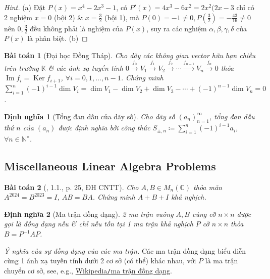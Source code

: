 \documentclass{article}
\newtheorem{baitoan}{Bài toán}
\newtheorem{dinhnghia}{Định nghĩa}
\begin{document}
\begin{proof}[Hint]
	(a) Đặt $P(x) = x^4 - 2x^3 - 1$, có $P'(x) = 4x^3 - 6x^2 = 2x^2(2x - 3$ chỉ có 2 nghiệm $x = 0$ (bội 2) \& $x = \frac{3}{2}$ (bội 1), mà $P(0) = -1\ne0,P(\frac{3}{2}) = -\frac{43}{16}\ne0$ nên $0,\frac{3}{2}$ đều không phải là nghiệm của $P(x)$, suy ra các nghiệm $\alpha,\beta,\gamma,\delta$ của $P(x)$ là phân biệt. (b) 
\end{proof}

\begin{baitoan}[Đại học Đồng Tháp]
	Cho dãy các không gian vector hữu hạn chiều trên trường $\mathbb{K}$ \& các ánh xạ tuyến tính $0\xrightarrow{f_0}V_1\xrightarrow{f_1}V_2\xrightarrow{f_2}\cdots\xrightarrow{f_{n-1}}V_n\xrightarrow{f_n}0$ thỏa $\operatorname{Im}f_i = \operatorname{Ker}f_{i+1}$, $\forall i = 0,1,\ldots,n-1$. Chứng minh $\sum_{i=1}^n (-1)^{i-1}\dim V_i = \dim V_1 - \dim V_2 + \dim V_3 - \cdots + (-1)^{n-1}\dim V_n = 0$.
\end{baitoan}

\begin{dinhnghia}[Tổng đan dấu của dãy số]
	Cho dãy số $(a_n)_{n=1}^\infty$, tổng đan dấu thứ $n$ của $(a_n)$ được định nghĩa bởi công thức $S_{\pm,n}\coloneqq\sum_{i=1}^n (-1)^{i-1}a_i$, $\forall n\in\mathbb{N}^\star$.
\end{dinhnghia}

\subsection{Miscellaneous Linear Algebra Problems}

\begin{baitoan}[\cite{VMS_VMC2024}, 1.1., p. 25, ĐH CNTT]
	Cho $A,B\in M_n(\mathbb{C})$ thỏa mãn $A^{2024} = B^{2023} = I$, $AB = BA$. Chứng minh $A + B + I$ khả nghịch.
\end{baitoan}

\begin{dinhnghia}[Ma trận đồng dạng]
	2 ma trận vuông $A,B$ cùng cỡ $n\times n$ được gọi là {\rm đồng dạng} nếu \& chỉ nếu tồn tại 1 ma trận khả nghịch $P$ cỡ $n\times n$ thỏa $B = P^{-1}AP$.
\end{dinhnghia}
{\it Ý nghĩa của sự đồng dạng của các ma trận.} Các ma trận đồng dạng biểu diễn cùng 1 ánh xạ tuyến tính dưới 2 cơ sở (có thể) khác nhau, với $P$ là ma trận chuyển cơ sở, see, e.g., \href{https://vi.wikipedia.org/wiki/Ma_tr%E1%BA%ADn_%C4%91%E1%BB%93ng_d%E1%BA%A1ng}{Wikipedia{\tt/}ma trận đồng dạng}.
\end{document}
